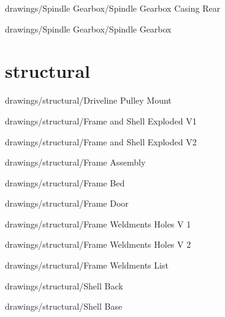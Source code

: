 
{drawings/Spindle Gearbox/Spindle Gearbox Casing Rear}


{drawings/Spindle Gearbox/Spindle Gearbox}

\section{structural}


{drawings/structural/Driveline Pulley Mount}


{drawings/structural/Frame and Shell Exploded V1}


{drawings/structural/Frame and Shell Exploded V2}


{drawings/structural/Frame Assembly}


{drawings/structural/Frame Bed}


{drawings/structural/Frame Door}


{drawings/structural/Frame Weldments Holes V 1}


{drawings/structural/Frame Weldments Holes V 2}


{drawings/structural/Frame Weldments List}


{drawings/structural/Shell Back}


{drawings/structural/Shell Base}

